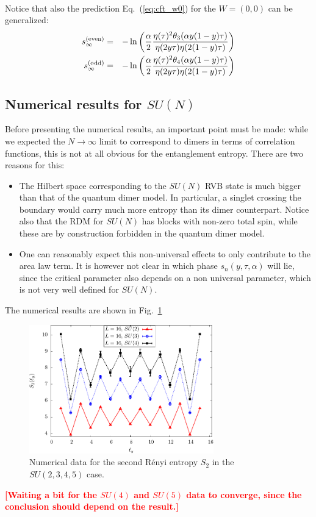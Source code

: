 \documentclass[11pt]{iopart}
\begin{document}
\paragraph{}
Notice that also the prediction Eq.~(\ref{eq:cft_w0}) for the $W=(0,0)$ can be generalized:
\begin{eqnarray}\label{eq:cft_w0_gen}
 s_\infty^{\rm (even)}&=&-\ln \left(\frac{\alpha}{2}\frac{\eta(\tau)^2\theta_3(\alpha y(1-y)\tau)}{\eta(2y\tau)\eta(2(1-y)\tau)}\right)\\\label{eq:cft_w0_gen2}
 s_\infty^{\rm (odd )}&=&-\ln \left(\frac{\alpha}{2}\frac{\eta(\tau)^2\theta_4(\alpha y(1-y)\tau)}{\eta(2y\tau)\eta(2(1-y)\tau)}\right)
\end{eqnarray}
\subsection{Numerical results for $SU(N)$}
\label{sec:sun_numerics}
Before presenting the numerical results, an important point must be made: while we expected the $N\to \infty$ limit to correspond to dimers in terms of correlation functions, this is not at all obvious for the entanglement entropy. There are two reasons for this:
\begin{itemize}
 \item The Hilbert space corresponding to the $SU(N)$ RVB state is much bigger than that of the quantum dimer model. In particular, a singlet crossing the boundary would carry much more entropy than its dimer counterpart. Notice also that the RDM for $SU(N)$ has blocks with non-zero total spin, while these are by construction forbidden in the quantum dimer model.  
 \item One can reasonably expect this non-universal effects to only contribute to the area law term. It is however not clear in which phase $s_n(y,\tau,\alpha)$ will lie, since the critical parameter also depends on a non universal parameter, which is not very well defined for $SU(N)$.
\end{itemize}
The numerical results are shown in Fig.~\ref{fig:SUN_shape}
\begin{figure}[ht]
 \begin{center}
  \includegraphics[width=8cm]{./figures/SUN_shape.pdf}
 \end{center}
\caption{Numerical data for the second R\'enyi entropy $S_2$ in the $SU(2,3,4,5)$ case. }
\label{fig:SUN_shape}
\end{figure}
\textcolor{red}{\bf [Waiting a bit for the $SU(4)$ and $SU(5)$ data to converge, since the conclusion should depend on the result.]}
\end{document}
